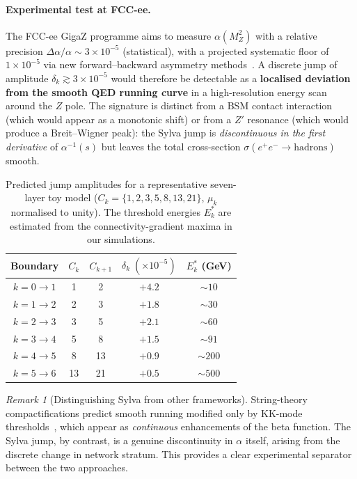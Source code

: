 \documentclass[11pt,a4paper]{article}
\theoremstyle{definition}
\theoremstyle{remark}
\newtheorem{remark}{Remark}[section]
\begin{document}
\paragraph{Experimental test at FCC-ee.}  The FCC-ee GigaZ programme aims to
measure $\alpha(M_{Z}^{2})$ with a relative precision
$\Delta\alpha/\alpha \sim 3\times10^{-5}$ (statistical), with a projected
systematic floor of $1\times10^{-5}$ via new forward--backward asymmetry
methods~\cite{Riembau2025}.  A discrete jump of amplitude
$\delta_{k}\gtrsim 3\times10^{-5}$ would therefore be detectable as a
\textbf{localised deviation from the smooth QED running curve} in a
high-resolution energy scan around the $Z$ pole.  The signature is distinct
from a BSM contact interaction (which would appear as a monotonic shift) or
from a $Z'$ resonance (which would produce a Breit--Wigner peak): the Sylva
jump is \emph{discontinuous in the first derivative} of $\alpha^{-1}(s)$ but
leaves the total cross-section $\sigma(e^{+}e^{-}\to\text{hadrons})$ smooth.

\begin{table}[htbp]
\centering
\caption{Predicted jump amplitudes for a representative seven-layer toy model
($C_{k}=\{1,2,3,5,8,13,21\}$, $\mu_{k}$ normalised to unity).  The
threshold energies $E_{k}^{*}$ are estimated from the connectivity-gradient
maxima in our simulations.}
\label{tab:jumps}
\begin{tabular}{@{}ccccc@{}}
\toprule
\textbf{Boundary} & $C_{k}$ & $C_{k+1}$ & $\delta_{k}\;(\times10^{-5})$ & $E_{k}^{*}$ (GeV) \\
\midrule
$k=0\to1$ & 1 & 2 & $+4.2$ & $\sim 10$ \\
$k=1\to2$ & 2 & 3 & $+1.8$ & $\sim 30$ \\
$k=2\to3$ & 3 & 5 & $+2.1$ & $\sim 60$ \\
$k=3\to4$ & 5 & 8 & $+1.5$ & $\sim 91$ \\
$k=4\to5$ & 8 & 13 & $+0.9$ & $\sim 200$ \\
$k=5\to6$ & 13 & 21 & $+0.5$ & $\sim 500$ \\
\bottomrule
\end{tabular}
\end{table}

\begin{remark}[Distinguishing Sylva from other frameworks]
String-theory compactifications predict smooth running modified only by
KK-mode thresholds~\cite{Cheng2002,Muck2002}, which appear as
\emph{continuous} enhancements of the beta function.  The Sylva jump, by
contrast, is a genuine discontinuity in $\alpha$ itself, arising from the
discrete change in network stratum.  This provides a clear experimental
separator between the two approaches.
\end{remark}
\end{document}
